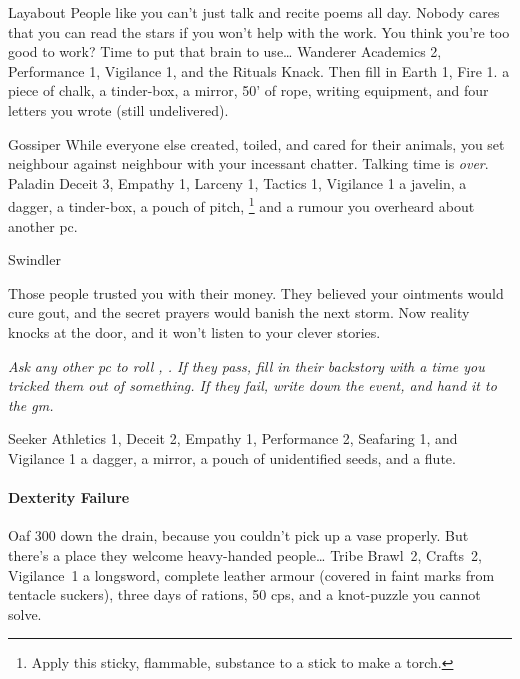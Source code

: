 \begin{multicols}{2}
\begin{itemize}
    {Layabout}%
    {
      People like you can't just talk and recite poems all day.
      Nobody cares that you can read the stars if you won't help with the work.
      You think you're too good to work?
      Time to put that brain to use\ldots
    }%
    {Wanderer}%
    {%
      Academics 2, Performance 1, Vigilance 1, and the Rituals Knack.
    Then fill in Earth 1, Fire 1.
    }%
    {
      a piece of chalk, a tinder-box, a mirror, 50' of rope, writing equipment, and four letters you wrote (still undelivered).
    }%

    {Gossiper}%
    {
      While everyone else created, toiled, and cared for their animals, you set neighbour against neighbour with your incessant chatter.
      Talking time is \emph{over}.
    }%
    {Paladin}%
    {Deceit 3, Empathy 1, Larceny 1, Tactics 1, Vigilance 1}%
    {
      a javelin, a dagger, a tinder-box, a pouch of pitch,%
      \footnote{Apply this sticky, flammable, substance to a stick to make a torch.}
      and a rumour you overheard about another \gls{pc}.
    }%

    {Swindler}%
    {
      Those people trusted you with their money.
      They believed your ointments would cure gout, and the secret prayers would banish the next storm.
      Now reality knocks at the door, and it won't listen to your clever stories.

      \textit{Ask any other \gls{pc} to roll , .
      If they pass, fill in their backstory with a time you tricked them out of something.
      If they fail, write down the event, and hand it to the \gls{gm}.}
    }%
    {Seeker}%
    {Athletics 1, Deceit 2, Empathy 1, Performance 2, Seafaring 1, and Vigilance 1}%
    {
      a dagger, a mirror, a pouch of unidentified seeds, and a flute.
    }%

\end{itemize}

\paragraph{Dexterity Failure}

\begin{itemize}

    {Oaf}%
    {
      300  down the drain, because you couldn't pick up a vase properly.
      But there's a place they welcome heavy-handed people\ldots
    }%
    {Tribe}%
    {
      Brawl~2, Crafts~2, Vigilance~1
    }%
    {
      a longsword, complete leather armour (covered in faint marks from tentacle suckers), three days of rations, 50 \glspl{cp}, and a knot-puzzle you cannot solve.
    }%


\end{itemize}
\end{multicols}
